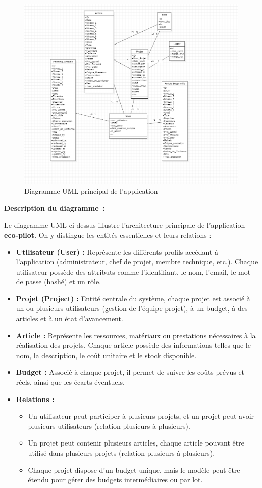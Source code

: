\documentclass[12pt,a4paper]{report}
\begin{document}
\begin{figure}[H]
    \centering
    \includegraphics[width=0.5\linewidth]{image.png}
    \caption{Diagramme UML principal de l’application}
    \label{fig:placeholder}
\end{figure}

\textbf{Description du diagramme~:}

Le diagramme UML ci-dessus illustre l’architecture principale de l’application \textbf{eco-pilot}. On y distingue les entités essentielles et leurs relations :

\begin{itemize}
    \item \textbf{Utilisateur (User) :} Représente les différents profils accédant à l’application (administrateur, chef de projet, membre technique, etc.). Chaque utilisateur possède des attributs comme l’identifiant, le nom, l’email, le mot de passe (hashé) et un rôle.
    \item \textbf{Projet (Project) :} Entité centrale du système, chaque projet est associé à un ou plusieurs utilisateurs (gestion de l’équipe projet), à un budget, à des articles et à un état d’avancement.
    \item \textbf{Article :} Représente les ressources, matériaux ou prestations nécessaires à la réalisation des projets. Chaque article possède des informations telles que le nom, la description, le coût unitaire et le stock disponible.
    \item \textbf{Budget :} Associé à chaque projet, il permet de suivre les coûts prévus et réels, ainsi que les écarts éventuels.
    \item \textbf{Relations :} 
    \begin{itemize}
        \item Un utilisateur peut participer à plusieurs projets, et un projet peut avoir plusieurs utilisateurs (relation plusieurs-à-plusieurs).
        \item Un projet peut contenir plusieurs articles, chaque article pouvant être utilisé dans plusieurs projets (relation plusieurs-à-plusieurs).
        \item Chaque projet dispose d’un budget unique, mais le modèle peut être étendu pour gérer des budgets intermédiaires ou par lot.
    \end{itemize}
\end{itemize}
\end{document}

